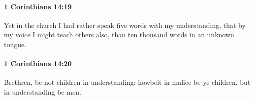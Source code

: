 		\paragraph{1 Corinthians 14:19} %
			\label{1CORINTHIANS-14-19}

			Yet in the church I had rather speak five words with my understanding, that by my voice I might teach others also, than ten thousand words in an unknown tongue.

			\begin{framed}
				\scriptsize
				\begin{compactdesc}
					\item[SBLG] 
				\end{compactdesc}
			\end{framed}

		\paragraph{1 Corinthians 14:20} %
			\label{1CORINTHIANS-14-20}

			Brethren, be not children in understanding: howbeit in malice be ye children, but in understanding be men.

